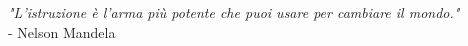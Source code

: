 \thispagestyle{plain}

{
\raggedleft
\textit{"L'istruzione è l'arma più potente che puoi usare per cambiare il mondo."}
\\ - Nelson Mandela

}